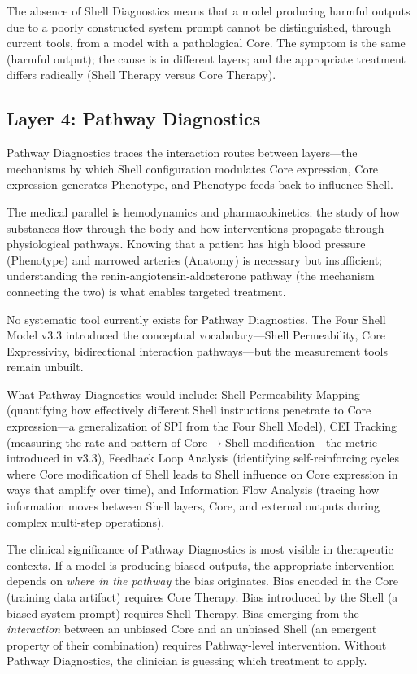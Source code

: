 \documentclass[11pt]{article}
\begin{document}
The absence of Shell Diagnostics means that a model producing harmful outputs due to a poorly constructed system prompt cannot be distinguished, through current tools, from a model with a pathological Core. The symptom is the same (harmful output); the cause is in different layers; and the appropriate treatment differs radically (Shell Therapy versus Core Therapy).

\subsection{Layer 4: Pathway Diagnostics}

Pathway Diagnostics traces the interaction routes between layers---the mechanisms by which Shell configuration modulates Core expression, Core expression generates Phenotype, and Phenotype feeds back to influence Shell.

The medical parallel is hemodynamics and pharmacokinetics: the study of how substances flow through the body and how interventions propagate through physiological pathways. Knowing that a patient has high blood pressure (Phenotype) and narrowed arteries (Anatomy) is necessary but insufficient; understanding the renin-angiotensin-aldosterone pathway (the mechanism connecting the two) is what enables targeted treatment.

No systematic tool currently exists for Pathway Diagnostics. The Four Shell Model v3.3 introduced the conceptual vocabulary---Shell Permeability, Core Expressivity, bidirectional interaction pathways---but the measurement tools remain unbuilt.

What Pathway Diagnostics would include: Shell Permeability Mapping (quantifying how effectively different Shell instructions penetrate to Core expression---a generalization of SPI from the Four Shell Model), CEI Tracking (measuring the rate and pattern of Core$\rightarrow$Shell modification---the metric introduced in v3.3), Feedback Loop Analysis (identifying self-reinforcing cycles where Core modification of Shell leads to Shell influence on Core expression in ways that amplify over time), and Information Flow Analysis (tracing how information moves between Shell layers, Core, and external outputs during complex multi-step operations).

The clinical significance of Pathway Diagnostics is most visible in therapeutic contexts. If a model is producing biased outputs, the appropriate intervention depends on \emph{where in the pathway} the bias originates. Bias encoded in the Core (training data artifact) requires Core Therapy. Bias introduced by the Shell (a biased system prompt) requires Shell Therapy. Bias emerging from the \emph{interaction} between an unbiased Core and an unbiased Shell (an emergent property of their combination) requires Pathway-level intervention. Without Pathway Diagnostics, the clinician is guessing which treatment to apply.
\end{document}
